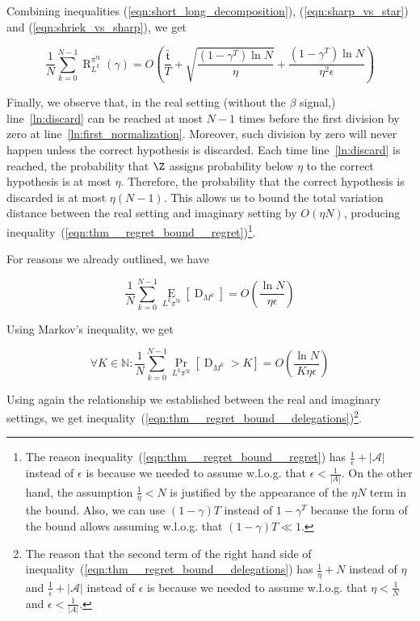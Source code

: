 \documentclass[anon,12pt]{colt2018} %
\newcommand{\AP}[1]{\left(#1\right)}
\newcommand{\AB}[1]{\left[#1\right]}
\newcommand{\Pa}[2]{\underset{#1}{\operatorname{Pr}}\AB{#2}}
\newcommand{\Ea}[2]{\underset{#1}{\operatorname{E}}\AB{#2}}
\newcommand{\Nats}{\mathbb{N}}
\newcommand{\Abs}[1]{\left\vert #1 \right\vert}
\newcommand{\A}{\mathcal{A}}
\newcommand{\Rg}{\operatorname{R}}
\newcommand{\Tn}{\mathfrak{t}}
\newcommand{\ND}{\operatorname{D}}
\newcommand{\IP}{\pi^{!k}}
\begin{document}
Combining inequalities (\ref{eqn:short_long_decomposition}), (\ref{eqn:sharp_vs_star}) and (\ref{eqn:shriek_vs_sharp}), we get

\begin{equation}
\frac{1}{N}\sum_{k=0}^{N-1}\Rg_{L^k}^{\IP}(\gamma) = O\AP{\frac{\bar{\Tn}}{T}+\sqrt{\frac{\AP{1-\gamma^T}\ln{N}}{\eta}}+\frac{\AP{1-\gamma^T}\ln{N}}{\eta^2\epsilon}}
\end{equation}

Finally, we observe that, in the real setting (without the $\beta$ signal,) line~\ref{ln:discard} can be reached at most $N-1$ times before the first division by zero at line~\ref{ln:first_normalization}. Moreover, such division by zero will never happen unless the correct hypothesis is discarded. Each time line~\ref{ln:discard} is reached, the probability that $\Z$ assigns probability below $\eta$ to the correct hypothesis is at most $\eta$. Therefore, the probability that the correct hypothesis is discarded is at most $\eta(N-1)$. This allows us to bound the total variation distance between the real setting and imaginary setting by $O(\eta N)$, producing inequality~(\ref{eqn:thm__regret_bound__regret})\footnote{The reason inequality~(\ref{eqn:thm__regret_bound__regret}) has $\frac{1}{\epsilon}+\Abs{\A}$ instead of $\epsilon$ is because we needed to assume w.l.o.g. that $\epsilon < \frac{1}{\Abs{A}}$. On the other hand, the assumption $\frac{1}{\eta}<N$ is justified by the appearance of the $\eta N$ term in the bound. Also, we can use $(1-\gamma)T$ instead of $1-\gamma^T$ because the form of the bound allows assuming w.l.o.g. that $(1-\gamma)T \ll 1$.}.

For reasons we already outlined, we have

\begin{equation}
\frac{1}{N}\sum_{k=0}^{N-1} \Ea{L^k\pi^{!k}}{\ND_{M^k}} = O\AP{\frac{\ln{N}}{\eta\epsilon}}
\end{equation}

Using Markov's inequality, we get

\begin{equation}
\forall K\in\Nats: \frac{1}{N}\sum_{k=0}^{N-1} \Pa{L^k\pi^{!k}}{\ND_{M^k}> K} = O\AP{\frac{\ln{N}}{K\eta\epsilon}}
\end{equation}

Using again the relationship we established between the real and imaginary settings, we get inequality~(\ref{eqn:thm__regret_bound__delegations})\footnote{The reason that the second term of the right hand side of inequality~(\ref{eqn:thm__regret_bound__delegations}) has $\frac{1}{\eta}+N$ instead of $\eta$ and $\frac{1}{\epsilon}+\Abs{\A}$ instead of $\epsilon$ is because we needed to assume w.l.o.g. that $\eta < \frac{1}{N}$ and $\epsilon < \frac{1}{\Abs{A}}$.}.
\end{document}
